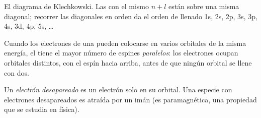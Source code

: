 \begin{omfigure}

{\small El diagrama de Klechkowski. Las  con el mismo $n + l$ están
sobre una misma diagonal; recorrer las diagonales en orden da el orden de
llenado
1s, 2s, 2p, 3s, 3p, 4s, 3d, 4p, 5s, \dots}
\end{omfigure}

\begin{proposition}\label{prop:b1:quantum-numbers:hund}
Cuando los electrones de una  pueden colocarse en varios orbitales
de la misma energía, el  tiene el mayor número de
espines \emph{paralelos}: los electrones ocupan orbitales distintos, con
el espín hacia arriba, antes de que ningún orbital se llene con dos.
\end{proposition}
\admitted

\begin{definition}\label{def:b1:quantum-numbers:unpaired}
Un \emph{electrón desapareado} es un electrón
solo en su orbital. Una especie con electrones desapareados es atraída
por un imán (es paramagnética, una propiedad que se estudia en física).
\end{definition}


